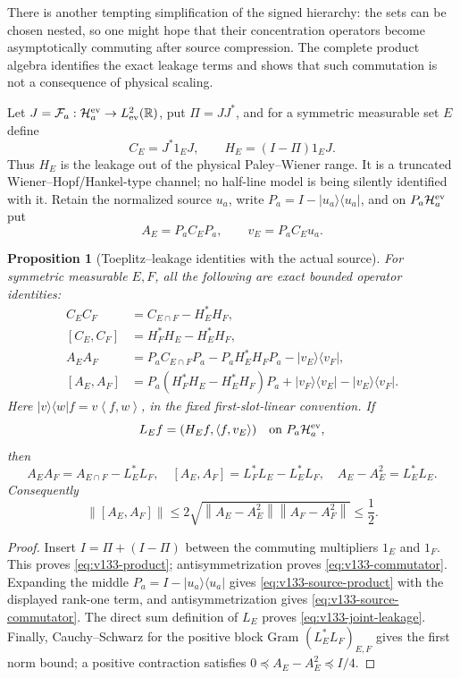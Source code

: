 \documentclass[11pt]{article}
\newtheorem{proposition}[theorem]{Proposition}
\theoremstyle{remark}
\newcommand{\norm}[1]{\left\lVert #1\right\rVert}
\newcommand{\ip}[2]{\left\langle #1,#2\right\rangle}
\begin{document}
There is another tempting simplification of the signed hierarchy: the
sets can be chosen nested, so one might hope that their concentration
operators become asymptotically commuting after source compression.
The complete product algebra identifies the exact leakage terms and
shows that such commutation is not a consequence of physical scaling.

Let $J=\mathcal F_a:\mathcal H_a^{\rm ev}\to L^2_{\rm ev}(\mathbb R)$,
put $\Pi=JJ^*$, and for a symmetric measurable set $E$ define
\[
 C_E=J^*1_EJ,
 \qquad H_E=(I-\Pi)1_EJ.
\]
Thus $H_E$ is the leakage out of the physical Paley--Wiener range.  It
is a truncated Wiener--Hopf/Hankel-type channel; no half-line model is
being silently identified with it.  Retain the normalized source $u_a$,
write $P_a=I-|u_a\rangle\langle u_a|$, and on
$P_a\mathcal H_a^{\rm ev}$ put
\[
 A_E=P_aC_EP_a,
 \qquad v_E=P_aC_Eu_a.
\]

\begin{proposition}[Toeplitz--leakage identities with the actual source]
\label{prop:v133-leakage}
For symmetric measurable $E,F$, all the following are exact bounded
operator identities:
\begin{align}
 C_EC_F&=C_{E\cap F}-H_E^*H_F,\label{eq:v133-product}\\
 [C_E,C_F]&=H_F^*H_E-H_E^*H_F,\label{eq:v133-commutator}\\
 A_EA_F&=P_aC_{E\cap F}P_a-P_aH_E^*H_FP_a
          -|v_E\rangle\langle v_F|,\label{eq:v133-source-product}\\
 [A_E,A_F]&=P_a(H_F^*H_E-H_E^*H_F)P_a
 +|v_F\rangle\langle v_E|-|v_E\rangle\langle v_F|.
 \label{eq:v133-source-commutator}
\end{align}
Here $|v\rangle\langle w|f=v\ip f w$, in the fixed first-slot-linear
convention.  If
\[
 L_Ef=(H_Ef,\ip f{v_E})
 \quad\hbox{on }P_a\mathcal H_a^{\rm ev},
\]
then
\begin{equation}
 A_EA_F=A_{E\cap F}-L_E^*L_F,
 \quad [A_E,A_F]=L_F^*L_E-L_E^*L_F,
 \quad A_E-A_E^2=L_E^*L_E.\label{eq:v133-joint-leakage}
\end{equation}
Consequently
\[
 \norm{[A_E,A_F]}
 \le2\sqrt{\norm{A_E-A_E^2}\norm{A_F-A_F^2}}
 \le\frac12.
\]
\end{proposition}
\begin{proof}
Insert $I=\Pi+(I-\Pi)$ between the commuting multipliers $1_E$ and
$1_F$.  This proves \eqref{eq:v133-product}; antisymmetrization proves
\eqref{eq:v133-commutator}.  Expanding the middle
$P_a=I-|u_a\rangle\langle u_a|$ gives
\eqref{eq:v133-source-product} with the displayed rank-one term, and
antisymmetrization gives \eqref{eq:v133-source-commutator}.  The direct
sum definition of $L_E$ proves \eqref{eq:v133-joint-leakage}.  Finally,
Cauchy--Schwarz for the positive block Gram
$(L_E^*L_F)_{E,F}$ gives the first norm bound; a positive contraction
satisfies $0\preceq A_E-A_E^2\preceq I/4$.
\end{proof}
\end{document}
